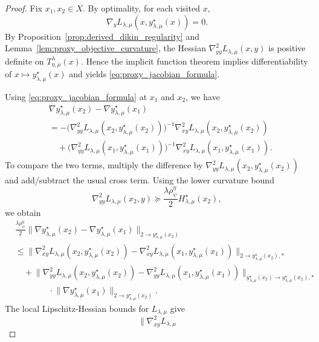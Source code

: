 \documentclass{article}
\begin{document}
\begin{proof}
Fix \(x_1,x_2\in X\). By optimality, for each visited \(x\),
\[
\nabla_y L_{\lambda,\mu}(x,y_{\lambda,\mu}^\star(x))=0.
\]
By Proposition~\ref{prop:derived_dikin_regularity} and
Lemma~\ref{lem:proxy_objective_curvature}, the Hessian
\(\nabla^2_{yy}L_{\lambda,\mu}(x,y)\) is positive definite on
\(T_{\eta,\mu}^{\lambda}(x)\). Hence the implicit function theorem implies differentiability of
\(x\mapsto y_{\lambda,\mu}^\star(x)\) and yields
\eqref{eq:proxy_jacobian_formula}.

Using \eqref{eq:proxy_jacobian_formula} at \(x_1\) and \(x_2\), we have
\begin{align}
&\nabla y_{\lambda,\mu}^\star(x_2)
-
\nabla y_{\lambda,\mu}^\star(x_1)
\nonumber\\
&=
-\Big(\nabla^2_{yy}L_{\lambda,\mu}
(x_2,y_{\lambda,\mu}^\star(x_2))\Big)^{-1}
\nabla^2_{xy}L_{\lambda,\mu}
(x_2,y_{\lambda,\mu}^\star(x_2))
\nonumber\\
&\quad
+
\Big(\nabla^2_{yy}L_{\lambda,\mu}
(x_1,y_{\lambda,\mu}^\star(x_1))\Big)^{-1}
\nabla^2_{xy}L_{\lambda,\mu}
(x_1,y_{\lambda,\mu}^\star(x_1)).
\label{eq:proxy_jacobian_difference}
\end{align}
To compare the two terms, multiply the difference by
\(\nabla^2_{yy}L_{\lambda,\mu}(x_2,y_{\lambda,\mu}^\star(x_2))\) and add/subtract the usual
cross term. Using the lower curvature bound
\[
\nabla^2_{yy}L_{\lambda,\mu}(x_2,y)
\succeq
\frac{\lambda\rho_\psi^\eta}{2}H_{\lambda,\mu}^\star(x_2),
\]
we obtain
\begin{align}
&\frac{\lambda\rho_\psi^\eta}{2}
\big\|
\nabla y_{\lambda,\mu}^\star(x_2)
-
\nabla y_{\lambda,\mu}^\star(x_1)
\big\|_{2\to y_{\lambda,\mu}^\star(x_2)}
\nonumber\\
&\le
\Big\|
\nabla^2_{xy}L_{\lambda,\mu}
(x_2,y_{\lambda,\mu}^\star(x_2))
-
\nabla^2_{xy}L_{\lambda,\mu}
(x_1,y_{\lambda,\mu}^\star(x_1))
\Big\|_{2\to y_{\lambda,\mu}^\star(x_2),*}
\nonumber\\
&\quad
+
\Big\|
\nabla^2_{yy}L_{\lambda,\mu}
(x_2,y_{\lambda,\mu}^\star(x_2))
-
\nabla^2_{yy}L_{\lambda,\mu}
(x_1,y_{\lambda,\mu}^\star(x_1))
\Big\|_{y_{\lambda,\mu}^\star(x_2)\to y_{\lambda,\mu}^\star(x_2),*}
\nonumber\\
&\qquad\qquad\cdot
\big\|
\nabla y_{\lambda,\mu}^\star(x_1)
\big\|_{2\to y_{\lambda,\mu}^\star(x_2)} .
\label{eq:proxy_jacobian_key_ineq}
\end{align}
The local Lipschitz-Hessian bounds for \(L_{\lambda,\mu}\) give
\[
\Big\|
\nabla^2_{xy}L_{\lambda,\mu}
\]
\end{proof}
\end{document}
